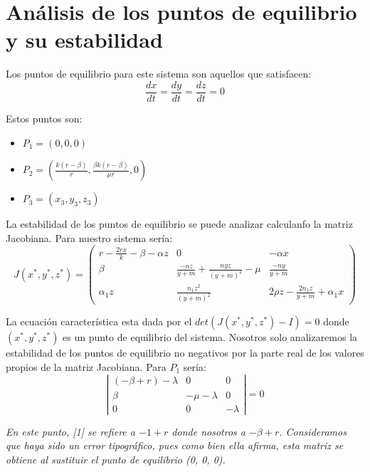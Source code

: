 \documentclass{wscpaperproc}
\theoremstyle{wsc}
\begin{document}
\section*{Análisis de los puntos de equilibrio y su estabilidad}

Los puntos de equilibrio para este sistema son aquellos que satisfacen:
$$\frac{dx}{dt}=\frac{dy}{dt}=\frac{dz}{dt}=0$$

Estos puntos son:
\begin{itemize}
	\item $P_1=(0, 0, 0)$
	\item $P_2=(\frac{k(r-\beta)}{r}, \frac{\beta k(r-\beta)}{\mu r}, 0)$
	\item $P_3=(x_3, y_3, z_3)$
\end{itemize}

La estabilidad de los puntos de equilibrio se puede analizar calculanfo la matriz Jacobiana. Para nuestro sistema sería:
$$ J(x^*, y^*, z^*) = \left(
	\begin{array}{ccc}
			r-\frac{2rx}{k}-\beta-\alpha z & 0                                       & -\alpha x                       \\
			\beta                          & \frac{-nz}{y+m}+\frac{nyz}{(y+m)^2}-\mu & \frac{-ny}{y+m}                 \\
			\alpha_1z                      & \frac{n_1z^2}{(y+m)^2}                  & 2\rho z-\frac{2n_1z}{y+m}+\alpha_1x
		\end{array}
	\right)$$

La ecuación característica esta dada por el $det(J(x^*, y^*, z^*)-I)=0$ donde $(x^*, y^*, z^*)$ es un punto de equilibrio del sistema.
Nosotros solo analizaremos la estabilidad de los puntos de equilibrio no negativos por la parte real de los valores propios de la matriz Jacobiana.
\vspace*{0.5cm}
Para $P_1$ sería:
$$\left|
	\begin{array}{ccc}
		(-\beta+r)-\lambda & 0            & 0        \\
		\beta              & -\mu-\lambda & 0        \\
		0                  & 0            & -\lambda
	\end{array}
	\right| =0$$

{\it En este punto, [1] se refiere a $-1+r$ donde nosotros a $-\beta+r$. Consideramos que haya sido un error tipográfico, pues como bien ella
		afirma, esta matriz se obtiene al sustituir el punto de equilibrio (0, 0, 0).}
\end{document}
